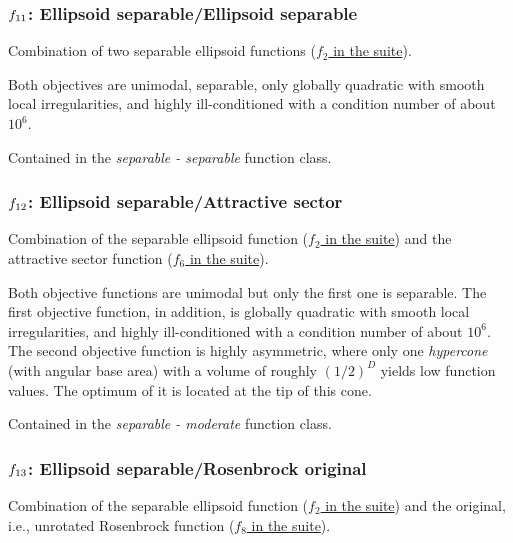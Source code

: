 \documentclass[letterpaper,12pt,english]{article}
\begin{document}
\subsubsection{\protect\(f_{11}\protect\): Ellipsoid separable/Ellipsoid separable}
\label{index:ellipsoid-separable-ellipsoid-separable}\label{index:f11}
Combination of two separable ellipsoid functions (\href{http://coco.lri.fr/downloads/download15.03/bbobdocfunctions.pdf\#page=10}{\(f_2\) in the  suite}).

Both objectives are unimodal, separable, only globally
quadratic with smooth local irregularities, and highly
ill-conditioned with a condition number of
about \(10^6\).

Contained in the \emph{separable - separable} function class.


\subsubsection{\protect\(f_{12}\protect\): Ellipsoid separable/Attractive sector}
\label{index:f12}\label{index:ellipsoid-separable-attractive-sector}
Combination of the separable ellipsoid function (\href{http://coco.lri.fr/downloads/download15.03/bbobdocfunctions.pdf\#page=10}{\(f_2\) in the  suite})
and the attractive sector function (\href{http://coco.lri.fr/downloads/download15.03/bbobdocfunctions.pdf\#page=30}{\(f_6\) in the  suite}).

Both objective functions are unimodal but only the first
one is separable. The first objective function, in addition,
is globally quadratic with smooth local irregularities, and
highly ill-conditioned with a condition number of about
\(10^6\). The second objective function is highly
asymmetric, where only one \emph{hypercone} (with
angular base area) with a volume of roughly \((1/2)^D\)
yields low function values. The optimum of it is located at
the tip of this cone.

Contained in the \emph{separable - moderate} function class.


\subsubsection{\protect\(f_{13}\protect\): Ellipsoid separable/Rosenbrock original}
\label{index:f13}\label{index:ellipsoid-separable-rosenbrock-original}
Combination of the separable ellipsoid function (\href{http://coco.lri.fr/downloads/download15.03/bbobdocfunctions.pdf\#page=10}{\(f_2\) in the  suite}) and the original, i.e., unrotated Rosenbrock function
(\href{http://coco.lri.fr/downloads/download15.03/bbobdocfunctions.pdf\#page=40}{\(f_8\) in the  suite}).
\end{document}
